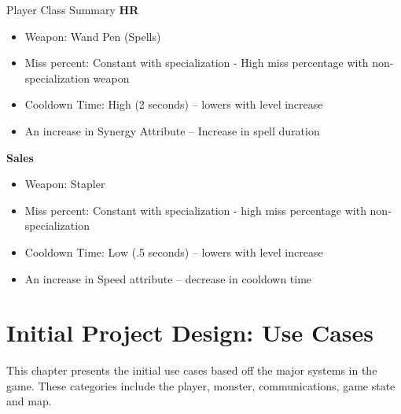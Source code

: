 \documentclass[12pt]{report}
\begin{document}
\begin{chapter}{Player Class Summary}
	\textbf{\large{HR}}
	\begin{itemize}
  	 \item Weapon: Wand Pen (Spells)
  	 \item Miss percent: Constant with specialization - High miss percentage with non-specialization weapon
  	 \item Cooldown Time: High (2 seconds) -- lowers with level increase
  	 \item An increase in Synergy Attribute -- Increase in spell duration
	\end{itemize}

	\textbf{\large{Sales}}
	\begin{itemize}
  	 \item Weapon: Stapler
  	 \item Miss percent: Constant with specialization - high miss percentage with non-specialization 
  	 \item Cooldown Time: Low (.5 seconds) -- lowers with level increase
  	 \item An increase in Speed attribute -- decrease in cooldown time
	\end{itemize}
\end{chapter}


\chapter{Initial Project Design: Use Cases}
This chapter presents the initial use cases based off the major systems in the game. These categories
include the player, monster, communications, game state and map.
  
\end{document}
